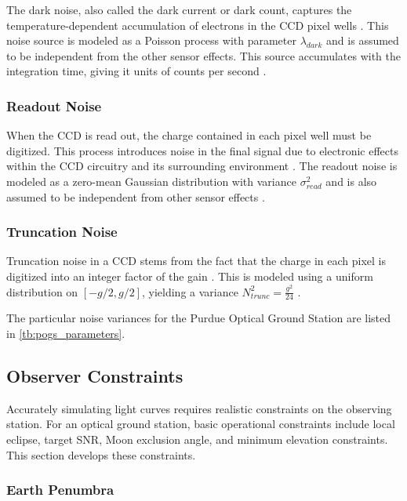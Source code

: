The dark noise, also called the dark current or dark count, captures the temperature-dependent accumulation of electrons in the CCD pixel wells \cite{krag2003}. This noise source is modeled as a Poisson process with parameter $\lambda_{dark}$ \cite{frueh2019notes} and is assumed to be independent from the other sensor effects. This source accumulates with the integration time, giving it units of counts per second \cite{krag2003}.

\subsubsection{Readout Noise}

When the CCD is read out, the charge contained in each pixel well must be digitized. This process introduces noise in the final signal due to electronic effects within the CCD circuitry and its surrounding environment \cite{krag2003}. The readout noise is modeled as a zero-mean Gaussian distribution with variance $\sigma_{read}^2$ and is also assumed to be independent from other sensor effects \cite{frueh2019notes}.

\subsubsection{Truncation Noise}

Truncation noise in a CCD stems from the fact that the charge in each pixel is digitized into an integer factor of the gain \cite{frueh2019notes}. This is modeled using a uniform distribution on $\left[ -g/2, g/2 \right]$, yielding a variance $N^2_{trunc} = \frac{g^2}{24}$ \cite{frueh2019notes}.

The particular noise variances for the Purdue Optical Ground Station are listed in \ref{tb:pogs_parameters}.


\subsection{Observer Constraints}

Accurately simulating light curves requires realistic constraints on the observing station. For an optical ground station, basic operational constraints include local eclipse, target SNR, Moon exclusion angle, and minimum elevation constraints. This section develops these constraints.

\subsubsection{Earth Penumbra}


